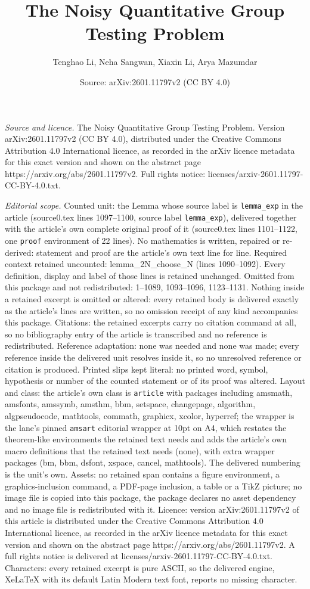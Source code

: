 \documentclass[10pt,a4paper]{amsart}
\title[The Noisy Quantitative Group Testing Problem]{The Noisy Quantitative Group Testing Problem}
\author{Tenghao Li, Neha Sangwan, Xiaxin Li, Arya Mazumdar}
\date{Source: arXiv:2601.11797v2 (CC BY 4.0)}
\begin{document}
\maketitle

\noindent\emph{Source and licence.} The Noisy Quantitative Group Testing Problem. Version arXiv:2601.11797v2 (CC BY 4.0), distributed under the Creative Commons Attribution 4.0 International licence, as recorded in the arXiv licence metadata for this exact version and shown on the abstract page https://arxiv.org/abs/2601.11797v2. Full rights notice: licenses/arxiv-2601.11797-CC-BY-4.0.txt.\par\smallskip

\noindent\textit{Editorial scope.} Counted unit: the Lemma whose source label is \texttt{lemma\_exp} in the article (source0.tex lines 1097--1100, source label \texttt{lemma\_exp}), delivered together with the article's own complete original proof of it (source0.tex lines 1101--1122, one \texttt{proof} environment of 22 lines). No mathematics is written, repaired or re-derived: statement and proof are the article's own text line for line. Required context retained uncounted: lemma\_2N\_choose\_N (lines 1090--1092). Every definition, display and label of those lines is retained unchanged. Omitted from this package and not redistributed: 1--1089, 1093--1096, 1123--1131. Nothing inside a retained excerpt is omitted or altered: every retained body is delivered exactly as the article's lines are written, so no omission receipt of any kind accompanies this package. Citations: the retained excerpts carry no citation command at all, so no bibliography entry of the article is transcribed and no reference is redistributed. Reference adaptation: none was needed and none was made; every reference inside the delivered unit resolves inside it, so no unresolved reference or citation is produced. Printed slips kept literal: no printed word, symbol, hypothesis or number of the counted statement or of its proof was altered. Layout and class: the article's own class is \texttt{article} with packages including amsmath, amsfonts, amssymb, amsthm, bbm, setspace, changepage, algorithm, algpseudocode, mathtools, commath, graphicx, xcolor, hyperref; the wrapper is the lane's pinned \texttt{amsart} editorial wrapper at 10pt on A4, which restates the theorem-like environments the retained text needs and adds the article's own macro definitions that the retained text needs (none), with extra wrapper packages (bm, bbm, dsfont, xspace, cancel, mathtools). The delivered numbering is the unit's own. Assets: no retained span contains a figure environment, a graphics-inclusion command, a PDF-page inclusion, a table or a TikZ picture; no image file is copied into this package, the package declares no asset dependency and no image file is redistributed with it. Licence: version arXiv:2601.11797v2 of this article is distributed under the Creative Commons Attribution 4.0 International licence, as recorded in the arXiv licence metadata for this exact version and shown on the abstract page https://arxiv.org/abs/2601.11797v2. A full rights notice is delivered at licenses/arxiv-2601.11797-CC-BY-4.0.txt. Characters: every retained excerpt is pure ASCII, so the delivered engine, XeLaTeX with its default Latin Modern text font, reports no missing character.
\end{document}
